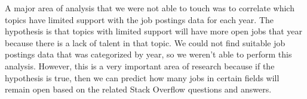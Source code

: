 A major area of analysis that we were not able to touch was to correlate which topics have limited support with the job postings data for each year. The hypothesis is that topics with limited support will have more open jobs that year because there is a lack of talent in that topic. We could not find suitable job postings data that was categorized by year, so we weren’t able to perform this analysis. However, this is a very important area of research because if the hypothesis is true, then we can predict how many jobs in certain fields will remain open based on the related Stack Overflow questions and answers.
